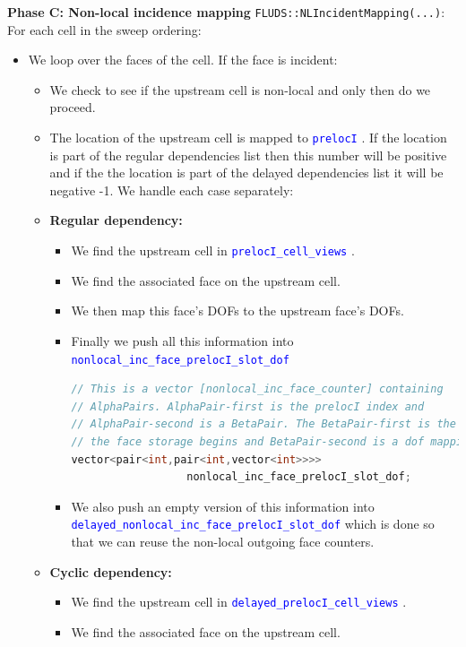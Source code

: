 \documentclass[11pt,letterpaper,titlepage]{article}
\newcommand{\xmltag}[1]{\textcolor{blue}{ \texttt{#1}} }
\numberwithin{equation}{section}
\begin{document}
\vspace{0.25in}
\textbf{Phase C: Non-local incidence mapping}\newline
\texttt{FLUDS::NLIncidentMapping(...)}:\newline
For each cell in the sweep ordering:
\begin{itemize}
\item We loop over the faces of the cell. If the face is incident:
\begin{itemize}
\item We check to see if the upstream cell is non-local and only then do we proceed.
\item The location of the upstream cell is mapped to \xmltag{prelocI}. If the location is part of the regular dependencies list then this number will be positive and if the the location is part of the delayed dependencies list it will be negative -1. We handle each case separately:
\item \textbf{Regular dependency:} 
\begin{itemize}
\item We find the upstream cell in \xmltag{prelocI\_cell\_views}.
\item We find the associated face on the upstream cell.
\item We then map this face's DOFs to the upstream face's DOFs.
\item Finally we push all this information into \xmltag{nonlocal\_inc\_face\_prelocI\_slot\_dof}
\begin{lstlisting}[language=c++]
// This is a vector [nonlocal_inc_face_counter] containing
// AlphaPairs. AlphaPair-first is the prelocI index and
// AlphaPair-second is a BetaPair. The BetaPair-first is the slot where
// the face storage begins and BetaPair-second is a dof mapping
vector<pair<int,pair<int,vector<int>>>>
                  nonlocal_inc_face_prelocI_slot_dof;
\end{lstlisting}
\item We also push an empty version of this information into \xmltag{delayed\_nonlocal\_inc\_face\_prelocI\_slot\_dof} which is done so that we can reuse the non-local outgoing face counters.
\end{itemize}
\item \textbf{Cyclic dependency:}
\begin{itemize}
\item We find the upstream cell in \xmltag{delayed\_prelocI\_cell\_views}.
\item We find the associated face on the upstream cell.

\end{itemize}
\end{itemize}
\end{itemize}
\end{document}
